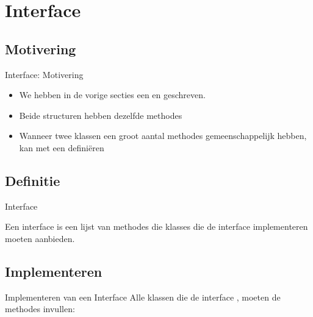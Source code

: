 \section{Interface}
\subsection{Motivering}
\begin{frame}[fragile]{Interface: Motivering}
\begin{itemize}
 \item We hebben in de vorige secties een \dsarraylist{} en \dslinkedlist{} geschreven.
 \item Beide structuren hebben dezelfde methodes
 \item Wanneer twee klassen een groot aantal methodes gemeenschappelijk hebben, kan met een  defini\"eren
\end{itemize}
\end{frame}
\subsection{Definitie}
\begin{frame}[fragile]{Interface}
\begin{definition}[Interface]
Een interface is een lijst van methodes die klasses die de interface implementeren moeten aanbieden.
\end{definition}
\end{frame}
\subsection{Implementeren}
\begin{frame}[fragile]{Implementeren van een Interface}
Alle klassen die de interface , moeten de methodes invullen:
\end{frame}